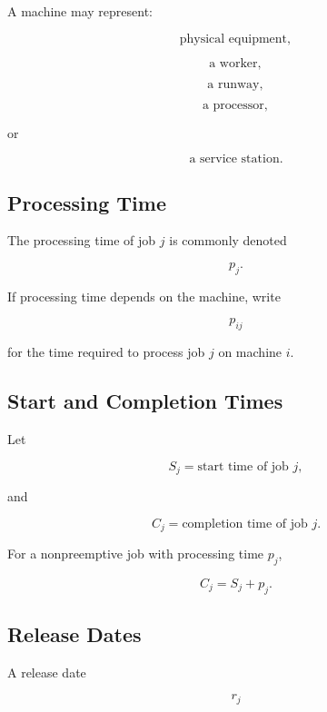 A machine may represent:

\[
\boxed{
\text{physical equipment},
}
\]

\[
\boxed{
\text{a worker},
}
\]

\[
\boxed{
\text{a runway},
}
\]

\[
\boxed{
\text{a processor},
}
\]

or

\[
\boxed{
\text{a service station}.
}
\]

\subsection{Processing Time}
\label{subsec:scheduling-processing-time}

The processing time of job \(j\) is commonly denoted

\[
\boxed{
p_j.
}
\]

If processing time depends on the machine, write

\[
\boxed{
p_{ij}
}
\]

for the time required to process job \(j\) on machine \(i\).

\subsection{Start and Completion Times}
\label{subsec:start-completion-times}

Let

\[
S_j
=
\text{start time of job }j,
\]

and

\[
C_j
=
\text{completion time of job }j.
\]

For a nonpreemptive job with processing time \(p_j\),

\[
\boxed{
C_j
=
S_j+p_j.
}
\]

\subsection{Release Dates}
\label{subsec:scheduling-release-dates}

A release date

\[
\boxed{
r_j
}
\]

